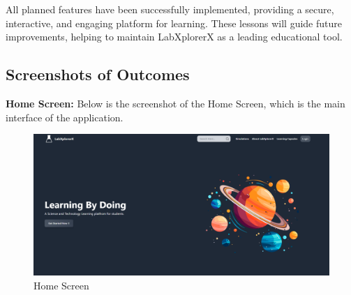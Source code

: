 All planned features have been successfully implemented, providing a secure, interactive, and engaging platform for learning. These lessons will guide future improvements, helping to maintain LabXplorerX as a leading educational tool.

\newpage
\subsection{Screenshots of Outcomes}
\textbf{Home Screen:} Below is the screenshot of the Home Screen, which is the main interface of the application.
\begin{figure}[H]
    \centering
    \includegraphics[width = 14cm]{Diagrams/output/home.png}
    \caption{Home Screen}
\end{figure}

